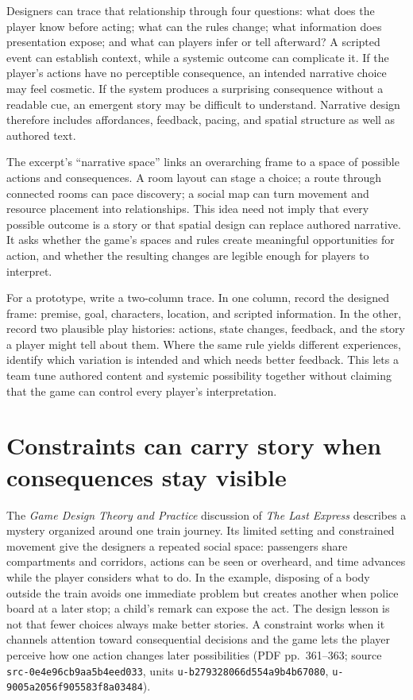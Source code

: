 Designers can trace that relationship through four questions: what does the player know before acting; what can the rules change; what information does presentation expose; and what can players infer or tell afterward? A scripted event can establish context, while a systemic outcome can complicate it. If the player's actions have no perceptible consequence, an intended narrative choice may feel cosmetic. If the system produces a surprising consequence without a readable cue, an emergent story may be difficult to understand. Narrative design therefore includes affordances, feedback, pacing, and spatial structure as well as authored text.

The excerpt's ``narrative space'' links an overarching frame to a space of possible actions and consequences. A room layout can stage a choice; a route through connected rooms can pace discovery; a social map can turn movement and resource placement into relationships. This idea need not imply that every possible outcome is a story or that spatial design can replace authored narrative. It asks whether the game's spaces and rules create meaningful opportunities for action, and whether the resulting changes are legible enough for players to interpret.

For a prototype, write a two-column trace. In one column, record the designed frame: premise, goal, characters, location, and scripted information. In the other, record two plausible play histories: actions, state changes, feedback, and the story a player might tell about them. Where the same rule yields different experiences, identify which variation is intended and which needs better feedback. This lets a team tune authored content and systemic possibility together without claiming that the game can control every player's interpretation.

\section{Constraints can carry story when consequences stay visible}\label{06-engine-ii-ch047-constraints-can-carry-story-when-consequences-stay-visible}

The \emph{Game Design Theory and Practice} discussion of \emph{The Last Express} describes a mystery organized around one train journey. Its limited setting and constrained movement give the designers a repeated social space: passengers share compartments and corridors, actions can be seen or overheard, and time advances while the player considers what to do. In the example, disposing of a body outside the train avoids one immediate problem but creates another when police board at a later stop; a child's remark can expose the act. The design lesson is not that fewer choices always make better stories. A constraint works when it channels attention toward consequential decisions and the game lets the player perceive how one action changes later possibilities (PDF pp.~361--363; source \texttt{src-0e4e96cb9aa5b4eed033}, units \texttt{u-b279328066d554a9b4b67080}, \texttt{u-9005a2056f905583f8a03484}).


